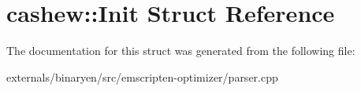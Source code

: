 \hypertarget{structcashew_1_1_init}{}\section{cashew\+:\+:Init Struct Reference}
\label{structcashew_1_1_init}


The documentation for this struct was generated from the following file\+:\begin{DoxyCompactItemize}
\item 
externals/binaryen/src/emscripten-\/optimizer/parser.\+cpp\end{DoxyCompactItemize}
